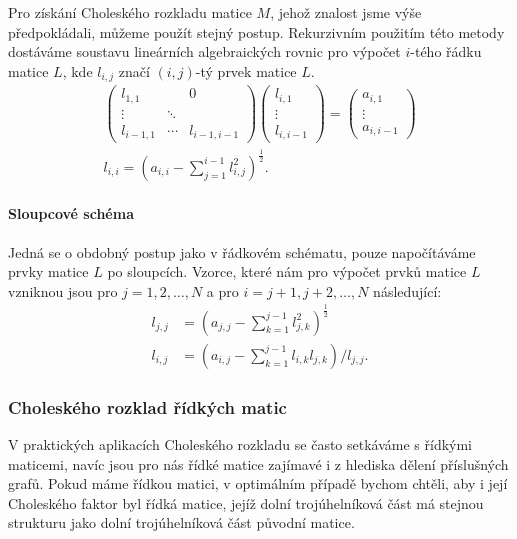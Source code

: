 \documentclass{ctuthesis}
\theoremstyle{plain}
\theoremstyle{definition}
\begin{document}
Pro získání Choleského rozkladu matice $M$, jehož znalost jsme výše předpokládali, můžeme použít stejný postup. Rekurzivním použitím této metody dostáváme soustavu lineárních algebraických rovnic pro výpočet $i$-tého řádku matice $L$, kde $l_{i,j}$ značí $(i,j)$-tý prvek matice $L$.
\begin{gather*}
\begin{pmatrix}
  l_{1,1} &  & 0 \\
  \vdots  & \ddots &  \\
  l_{i-1,1} & \cdots & l_{i-1,i-1}
\end{pmatrix}
\begin{pmatrix}
  l_{i,1} \\
  \vdots \\
  l_{i,i-1}
\end{pmatrix}
=
\begin{pmatrix}
  a_{i,1} \\
  \vdots \\
  a_{i,i-1}
\end{pmatrix} \\
 l_{i,i} = \left(a_{i,i} - \sum_{j=1}^{i-1}{l_{i,j}^2}\right)^\frac12.
\end{gather*}

\paragraph{Sloupcové schéma}
Jedná se o obdobný postup jako v řádkovém schématu, pouze napočítáváme prvky matice $L$ po sloupcích. Vzorce, které nám pro výpočet prvků matice $L$ vzniknou jsou pro $j = 1,2,\ldots, N$ a pro $i = j+1,j+2,\ldots,N$ následující:
\begin{align*}
  l_{j,j} &= \left(a_{j,j} - \sum_{k=1}^{j-1}{l_{j,k}^2}\right)^\frac12 \\
  l_{i,j} &= \left(a_{i,j} - \sum_{k=1}^{j-1}{l_{i,k}l_{j,k}}\right)/l_{j,j}.
\end{align*}

\subsubsection{Choleského rozklad řídkých matic}
\label{Choleskysparse}

V praktických aplikacích Choleského rozkladu se často setkáváme s řídkými maticemi, navíc jsou pro nás řídké matice zajímavé i z hlediska dělení příslušných grafů. Pokud máme řídkou matici, v optimálním případě bychom chtěli, aby i její Choleského faktor byl řídká matice, jejíž dolní trojúhelníková část má stejnou strukturu jako dolní trojúhelníková část původní matice.
\end{document}
